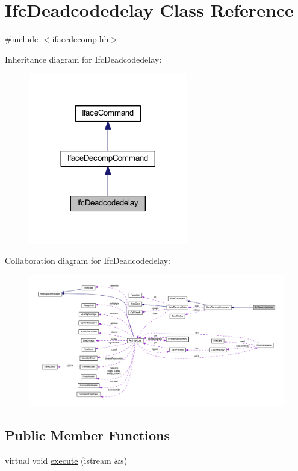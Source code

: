 \hypertarget{class_ifc_deadcodedelay}{}\section{Ifc\+Deadcodedelay Class Reference}
\label{class_ifc_deadcodedelay}


{\ttfamily \#include $<$ifacedecomp.\+hh$>$}



Inheritance diagram for Ifc\+Deadcodedelay\+:
\nopagebreak
\begin{figure}[H]
\begin{center}
\leavevmode
\includegraphics[width=197pt]{class_ifc_deadcodedelay__inherit__graph}
\end{center}
\end{figure}


Collaboration diagram for Ifc\+Deadcodedelay\+:
\nopagebreak
\begin{figure}[H]
\begin{center}
\leavevmode
\includegraphics[width=350pt]{class_ifc_deadcodedelay__coll__graph}
\end{center}
\end{figure}
\subsection*{Public Member Functions}
\begin{DoxyCompactItemize}
\item 
virtual void \mbox{\hyperlink{class_ifc_deadcodedelay_ab3c538082471ef04a5cf0c48efd8a767}{execute}} (istream \&s)
\end{DoxyCompactItemize}
